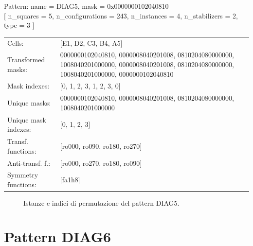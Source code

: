 \begin{tcolorbox}[sharp corners, fontupper=\ttfamily\small, colback=white]
  \noindent Pattern: name = DIAG5, mask = 0x0000000102040810\\
  {[} n\_squares = 5, n\_configurations = 243,
  n\_instances = 4, n\_stabilizers = 2, type = 3 { ]}\\[1.0ex]
  \begin{tabularx}{\textwidth}{@{} p{3.5cm} X @{}}
    Cells:               & {[}E1, D2, C3, B4, A5{]}\\[0.5ex]
    Transformed masks:   & 0000000102040810, 0000008040201008, 0810204080000000, 1008040201000000, 0000008040201008, 0810204080000000, 1008040201000000, 0000000102040810\\[0.5ex]
    Mask indexes:        & {[}0, 1, 2, 3, 1, 2, 3, 0{]}\\[0.5ex]
    Unique masks:        & 0000000102040810, 0000008040201008, 0810204080000000, 1008040201000000\\[0.5ex]
    Unique mask indexes: & {[}0, 1, 2, 3{]}\\[0.5ex]
    Transf. functions:   & {[}ro000, ro090, ro180, ro270{]}\\[0.5ex]
    Anti-transf. f.:     & {[}ro000, ro270, ro180, ro090{]}\\[0.5ex]
    Symmetry functions:  & {[}fa1h8{]}\\[0.5ex]
  \end{tabularx}
\end{tcolorbox}

\begin{figure}[htbp]
  \centering
   \hfill
   \hfill
   \hfill
  \vspace{0.3cm}
   \hfill
   \hfill
   \hfill
  \caption{Istanze e indici di permutazione del pattern DIAG5.}
\end{figure}

\newpage

\section{Pattern DIAG6}

